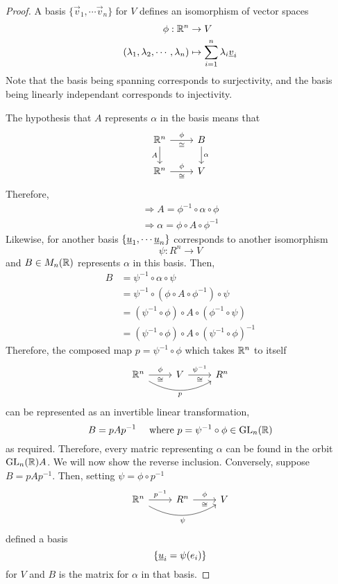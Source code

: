 \documentclass{article}
\begin{document}
\begin{proof}
    A basis $\{\vec{v}_1, \cdots \vec{v}_n\}$ for $V$ defines an isomorphism of vector spaces
    \begin{align*}
        \phi: \mathbb{R}^n &\rightarrow V \\
        (\lambda_1, \lambda_2, \cdots, \lambda_n) &\mapsto \sum_{i=1}^{n}{\lambda_i \underline{v}_i}
    \end{align*}
    Note that the basis being spanning corresponds to surjectivity, 
    and the basis being linearly independant corresponds to injectivity.
    
    The hypothesis that $A$ represents $\alpha$ in the basis means that
    \[
        \begin{tikzcd}
            \R^n \arrow[r, "\phi", "\cong"'] \arrow[d, swap, "A"] & B \arrow[d, "\alpha"] \\
            \R^n \arrow[r, "\phi", "\cong"'] & V
        \end{tikzcd}
    \]
    Therefore,
    \begin{align*}
        \Rightarrow A = \phi^{-1} \circ \alpha \circ \phi \\
        \Rightarrow \alpha = \phi \circ A \circ \phi^{-1}
    \end{align*}
    Likewise, for another basis $\left\{ \underline{u}_1, \cdots \underline{u}_n \right\}$ corresponds to another isomorphism
    \[
        \psi: R^n \rightarrow V  
    \]
    and $B \in M_n(\mathbb{R})$ represents $\alpha$ in this basis. Then,
    \begin{align*}
        B &= \psi^{-1} \circ \alpha \circ \psi \\
        &= \psi^{-1} \circ (\phi \circ A \circ \phi^{-1}) \circ \psi \\
        &= (\psi^{-1} \circ \phi) \circ A \circ (\phi^{-1} \circ \psi) \\
        &= (\psi^{-1} \circ \phi) \circ A \circ (\psi^{-1} \circ \phi)^{-1}
    \end{align*}
    Therefore, the composed map $p = \psi^{-1} \circ \phi$ which takes $\mathbb{R}^n$ to itself
    \[
        \begin{tikzcd}
            \R^n \arrow[r, "\phi", "\cong"'] \arrow[rr, bend right, "p"'] & V \arrow[r, "\psi^{-1}", "\cong"'] & R^n
        \end{tikzcd}
    \]
    can be represented as an invertible linear transformation,
    \[
        B = pAp^{-1} \quad \text{ where } p = \psi^{-1} \circ \phi \in \mathrm{GL}_n(\mathbb{R})
    \]
    as required. Therefore, every matric representing $\alpha$ can be found in the orbit $\mathrm{GL}_n(\mathbb{R})A$.
    We will now show the reverse inclusion. Conversely, suppose $B = pAp^{-1}$. Then, setting $\psi = \phi \circ p^{-1}$
    \[
        \begin{tikzcd}
            \R^n \arrow[r, "p^{-1}"] \arrow[rr, bend right, "\psi"'] & R^n \arrow[r, "\phi", "\cong"'] & V
        \end{tikzcd}
    \]
    defined a basis
    \[
        \left\{ \underline{u}_i = \psi(e_i) \right\}  
    \]
    for $V$ and $B$ is the matrix for $\alpha$ in that basis.
\end{proof}
\end{document}
